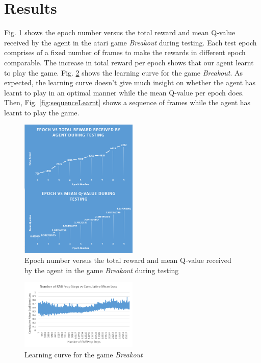 \documentclass[conference]{IEEEtran}
\begin{document}
\section{Results}
Fig. \ref{fig:epochVsReward} shows the epoch number versus the total reward and mean Q-value received by the agent in the atari game \textit{Breakout} during testing. Each test epoch comprises of a fixed number of frames to make the rewards in different epoch comparable. The increase in total reward per epoch shows that our agent learnt to play the game. Fig. \ref{fig:learningCurve} shows the learning curve for the game \textit{Breakout}. As expected, the learning curve doesn't give much insight on whether the agent has learnt to play in an optimal manner while the mean Q-value per epoch does. Then, Fig. \ref{fig:sequenceLearnt}  shows a sequence of frames while the agent has learnt to play the game.
\begin{figure}[h]
\includegraphics[width=0.5\textwidth]{epochVsReward}
\caption[width=\textwidth]{Epoch number versus the total reward and mean Q-value received by the agent in the game \textit{Breakout} during testing}
\label{fig:epochVsReward}
\end{figure}

\begin{figure}[h]
\includegraphics[width=0.5\textwidth]{learningCurve}
\caption[width=\textwidth]{Learning curve for the game \textit{Breakout}}
\label{fig:learningCurve}
\end{figure}
\end{document}
